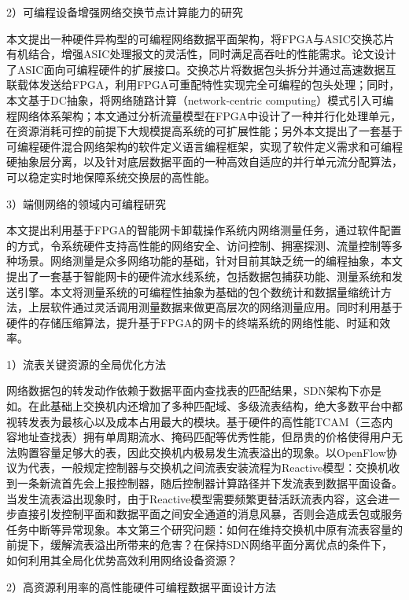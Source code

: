 2）可编程设备增强网络交换节点计算能力的研究

本文提出一种硬件异构型的可编程网络数据平面架构，将FPGA与ASIC交换芯片有机结合，增强ASIC处理报文的灵活性，同时满足高吞吐的性能需求。论文设计了ASIC面向可编程硬件的扩展接口。交换芯片将数据包头拆分并通过高速数据互联载体发送给FPGA，利用FPGA可重配特性实现完全可编程的包头处理；同时，本文基于DC抽象，将网络随路计算（network-centric computing）模式引入可编程网络体系架构；本文通过分析流量模型在FPGA中设计了一种并行化处理单元，在资源消耗可控的前提下大规模提高系统的可扩展性能；另外本文提出了一套基于可编程硬件混合网络架构的软件定义语言编程框架，实现了软件定义需求和可编程硬抽象层分离，以及针对底层数据平面的一种高效自适应的并行单元流分配算法，可以稳定实时地保障系统交换层的高性能。


3）端侧网络的领域内可编程研究

本文提出利用基于FPGA的智能网卡卸载操作系统内网络测量任务，通过软件配置的方式，令系统硬件支持高性能的网络安全、访问控制、拥塞探测、流量控制等多种场景。网络测量是众多网络功能的基础，针对目前其缺乏统一的编程抽象，本文提出了一套基于智能网卡的硬件流水线系统，包括数据包捕获功能、测量系统和发送引擎。本文将测量系统的可编程性抽象为基础的包个数统计和数据量缩统计方法，上层软件通过灵活调用测量数据来做更高层次的网络测量应用。同时利用基于硬件的存储压缩算法，提升基于FPGA的网卡的终端系统的网络性能、时延和效率。





\label{chap13}

1）流表关键资源的全局优化方法

网络数据包的转发动作依赖于数据平面内查找表的匹配结果，SDN架构下亦是如。在此基础上交换机内还增加了多种匹配域、多级流表结构，绝大多数平台中都视转发表为最核心以及成本占用最大的模块。基于硬件的高性能TCAM（三态内容地址查找表）拥有单周期流水、掩码匹配等优秀性能，但昂贵的价格使得用户无法购置容量足够大的表，因此交换机内极易发生流表溢出的现象。以OpenFlow协议为代表，一般规定控制器与交换机之间流表安装流程为Reactive模型：交换机收到一条新流首先会上报控制器，随后控制器计算路径并下发流表到数据平面设备。当发生流表溢出现象时，由于Reactive模型需要频繁更替活跃流表内容，这会进一步直接引发控制平面和数据平面之间安全通道的消息风暴，否则会造成丢包或服务任务中断等异常现象。本文第三个研究问题：如何在维持交换机中原有流表容量的前提下，缓解流表溢出所带来的危害？在保持SDN网络平面分离优点的条件下，如何利用其全局化优势高效利用网络设备资源？

2）高资源利用率的高性能硬件可编程数据平面设计方法

